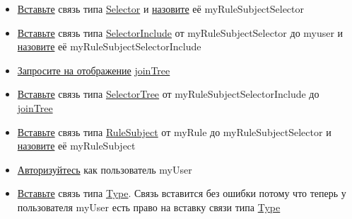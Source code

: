 \begin{itemize}
  \item \hyperlink{DeepCase.InsertLink.Description}{Вставьте} связь типа
  \hyperlink{Core.Selector.Description}{Selector} и
  \hyperlink{FAQ.HowToSetName}{назовите} её myRuleSubjectSelector
  \item \hyperlink{DeepCase.InsertLink.Description}{Вставьте} связь типа
  \hyperlink{Core.SelectorInclude.Description}{SelectorInclude} от myRuleSubjectSelector до myuser и
  \hyperlink{FAQ.HowToSetName}{назовите} её myRuleSubjectSelectorInclude
  \item \hyperlink{Core.Query.Description}{Запросите на отображение} \hyperlink{Core.joinTree.Description}{joinTree}
  \item \hyperlink{DeepCase.InsertLink.Description}{Вставьте} связь типа
  \hyperlink{Core.SelectorTree.Description}{SelectorTree} от myRuleSubjectSelectorInclude до \hyperlink{Core.joinTree.Description}{joinTree}
  \item \hyperlink{DeepCase.InsertLink.Description}{Вставьте} связь типа
  \hyperlink{Core.RuleSubject.Description}{RuleSubject} от myRule до myRuleSubjectSelector и
  \hyperlink{FAQ.HowToSetName}{назовите} её myRuleSubject

  \item \hyperlink{DeepCase.Login.Description}{Авторизуйтесь} как пользователь myUser
  \item \hyperlink{DeepCase.InsertLink.Description}{Вставьте} связь типа
  \hyperlink{Core.Type.Description}{Type}. Связь вставится без ошибки потому что теперь у пользователя myUser есть право на вставку связи типа \hyperlink{Core.Type.Description}{Type}
\end{itemize}